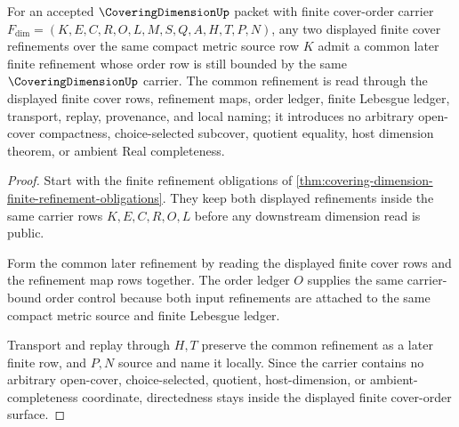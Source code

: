\begin{theorem}
\label{thm:covering-dimension-cover-order-directedness}
For an accepted $\CoveringDimensionUp$ packet with finite cover-order carrier $F_{\dim}=(K,E,C,R,O,L,M,S,Q,A,H,T,P,N)$, any two displayed finite cover refinements over the same compact metric source row $K$ admit a common later finite refinement whose order row is still bounded by the same $\CoveringDimensionUp$ carrier. The common refinement is read through the displayed finite cover rows, refinement maps, order ledger, finite Lebesgue ledger, transport, replay, provenance, and local naming; it introduces no arbitrary open-cover compactness, choice-selected subcover, quotient equality, host dimension theorem, or ambient Real completeness.
\end{theorem}
\begin{proof}
Start with the finite refinement obligations of \autoref{thm:covering-dimension-finite-refinement-obligations}. They keep both displayed refinements inside the same carrier rows $K,E,C,R,O,L$ before any downstream dimension read is public.

Form the common later refinement by reading the displayed finite cover rows and the refinement map rows together. The order ledger $O$ supplies the same carrier-bound order control because both input refinements are attached to the same compact metric source and finite Lebesgue ledger.

Transport and replay through $H,T$ preserve the common refinement as a later finite row, and $P,N$ source and name it locally. Since the carrier contains no arbitrary open-cover, choice-selected, quotient, host-dimension, or ambient-completeness coordinate, directedness stays inside the displayed finite cover-order surface.
\end{proof}

